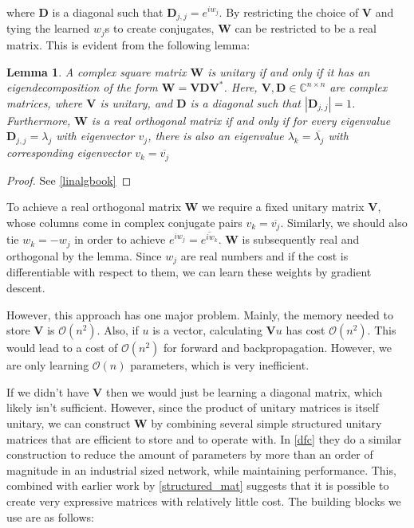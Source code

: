 \documentclass{article} %
\newcommand{\matr}[1]{\mathbf{#1}}
\newtheorem{lemma}{Lemma}
\begin{document}
where $\matr{D}$ is a diagonal such that $\matr{D}_{j,j} = e^{i w_j}$. By restricting the choice of $\matr{V}$ and tying the learned $w_j$s to create conjugates, $\matr{W}$ can be restricted to be a real matrix. This is evident from the following lemma:

\begin{lemma}
  A complex square matrix $\matr{W}$ is unitary if and only if it has an eigendecomposition of the form $\matr{W} = \matr{V} \matr{D} \matr{V}^*$. Here, $\matr{V}, \matr{D} \in \mathbb{C}^{n \times n}$ are complex matrices, where $\matr{V}$ is unitary, and $\matr{D}$ is a diagonal such that $|\matr{D}_{j,j}|=1$. Furthermore, $\matr{W}$ is a real orthogonal matrix if and only if for every eigenvalue $\matr{D}_{j,j} = \lambda_j$ with eigenvector $v_j$, there is also an eigenvalue $\lambda_k = \overline{\lambda_j}$ with corresponding eigenvector $v_k = \overline{v_j}$
\end{lemma}
\begin{proof}
  See \ref{linalgbook}
\end{proof}

To achieve a real orthogonal matrix $\matr{W}$ we require a fixed unitary matrix $\matr{V}$, whose columns come in complex conjugate pairs $v_k = \overline{v_j}$. Similarly, we should also tie $w_k=-w_j$ in order to achieve $e^{i w_j} = \overline{e^{i w_k}}$. $\matr{W}$ is subsequently real and orthogonal by the lemma. Since $w_j$ are real numbers and if the cost is differentiable with respect to them, we can learn these weights by gradient descent. 

However, this approach has one major problem. Mainly, the memory needed to store $\matr{V}$ is $\mathcal{O}\left(n^2\right)$. Also, if $u$ is a vector, calculating $\matr{V}u$ has cost $\mathcal{O}\left( n^2 \right)$. This would lead to a cost of $\mathcal{O} \left( n^2 \right)$ for forward and backpropagation. However, we are only learning $\mathcal{O}(n)$ parameters, which is very inefficient.

If we didn't have $\matr{V}$ then we would just be learning a diagonal matrix, which likely isn't sufficient. However, since the product of unitary matrices is itself unitary, we can construct $\matr{W}$ by combining several simple structured unitary matrices that are efficient to store and to operate with. In \ref{dfc} they do a similar construction to reduce the amount of parameters by more than an order of magnitude in an industrial sized network, while maintaining performance. This, combined with earlier work by \ref{structured_mat} suggests that it is possible to create very expressive matrices with relatively little cost. The building blocks we use are as follows:
\end{document}
